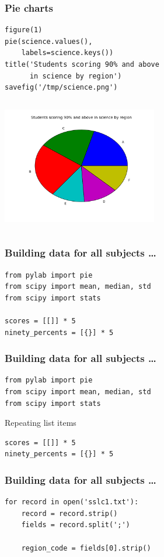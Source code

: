 \documentclass[14pt,compress]{beamer}
\begin{document}
\begin{frame}[fragile]
  \frametitle{Pie charts}
  \small
  \begin{lstlisting}
figure(1)
pie(science.values(), 
    labels=science.keys())
title('Students scoring 90% and above 
      in science by region')
savefig('/tmp/science.png')
  \end{lstlisting}
\begin{columns}
    \hspace*{1.1in}
\includegraphics[height=2in, interpolate=true]{data/science}
\end{columns}
\end{frame}

\begin{frame}[fragile]
  \frametitle{Building data for all subjects \ldots}
  \begin{lstlisting}
from pylab import pie
from scipy import mean, median, std
from scipy import stats

scores = [[]] * 5
ninety_percents = [{}] * 5
  \end{lstlisting}
\end{frame}

\begin{frame}[fragile]
  \frametitle{Building data for all subjects \ldots}
  \begin{lstlisting}
from pylab import pie
from scipy import mean, median, std
from scipy import stats
  \end{lstlisting}

  \begin{block}{Repeating list items}
    \begin{lstlisting}
scores = [[]] * 5
ninety_percents = [{}] * 5
    \end{lstlisting}
  \end{block}
\end{frame}

\begin{frame}[fragile]
  \frametitle{Building data for all subjects \ldots}
  \begin{lstlisting}
for record in open('sslc1.txt'):
    record = record.strip()
    fields = record.split(';')

    region_code = fields[0].strip()
  \end{lstlisting}
\end{frame}
\end{document}
